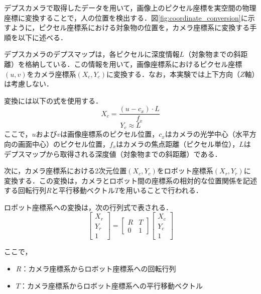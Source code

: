 デプスカメラで取得したデータを用いて，画像上のピクセル座標を実空間の物理座標に変換することで，人の位置を検出する．図\ref{fig:coordinate_conversion}に示すように，ピクセル座標系における対象物の位置を，カメラ座標系に変換する手順を以下に述べる．

デプスカメラのデプスマップは，各ピクセルに深度情報$L$（対象物までの斜距離）を格納している．この情報を用いて，画像座標系におけるピクセル座標$(u, v)$をカメラ座標系$(X_c, Y_c)$に変換する．なお，本実験では上下方向（$Z$軸）は考慮しない．

変換には以下の式を使用する．
\begin{equation}
    X_c = \frac{(u - c_x) \cdot L}{f_x}
    \label{eq:xc}
\end{equation}
\begin{equation}
    Y_c \approx L
    \label{eq:yc}
\end{equation}
ここで，$u$および$v$は画像座標系のピクセル位置，$c_x$はカメラの光学中心（水平方向の画面中心）のピクセル位置，$f_x$はカメラの焦点距離（ピクセル単位），$L$はデプスマップから取得される深度値（対象物までの斜距離）である．

次に，カメラ座標系における2次元位置$(X_c, Y_c)$をロボット座標系$(X_r, Y_r)$に変換する．この変換は，カメラとロボット間の座標系の相対的な位置関係を記述する回転行列$R$と平行移動ベクトル$T$を用いることで行われる．

ロボット座標系への変換は，次の行列式で表される．
\begin{equation}
    \begin{bmatrix}
        X_r \\ Y_r \\ 1
    \end{bmatrix}
    =
    \begin{bmatrix}
        R & T \\ 
        0 & 1
    \end{bmatrix}
    \begin{bmatrix}
        X_c \\ Y_c \\ 1
    \end{bmatrix}
    \label{eq:transform}
\end{equation}

ここで，
\begin{itemize}
    \item $R$：カメラ座標系からロボット座標系への回転行列
    \item $T$：カメラ座標系からロボット座標系への平行移動ベクトル
\end{itemize}

